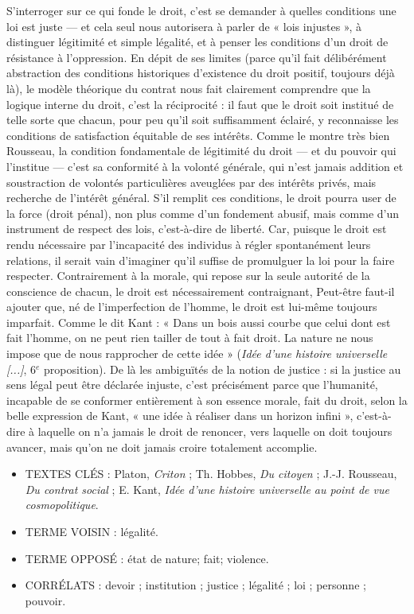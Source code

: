 S'interroger sur ce qui fonde le droit,
c'est se demander à quelles conditions
une loi est juste — et cela seul nous
autorisera à parler de « lois injustes », à
distinguer légitimité et simple légalité,
et à penser les conditions d’un droit de
résistance à l'oppression. En dépit de ses
limites (parce qu'il fait délibérément abstraction des conditions historiques
d'existence du droit positif, toujours déjà
là), le modèle théorique du contrat
nous fait clairement comprendre que la
logique interne du droit, c'est la réciprocité : il faut que le droit soit institué de
telle sorte que chacun, pour peu qu'il
soit suffisamment éclairé, y reconnaisse
les conditions de satisfaction équitable
de ses intérêts. Comme le montre très
bien Rousseau, la condition fondamentale de légitimité du droit — et du pouvoir qui l’institue — c'est sa conformité
à la volonté générale, qui n'est jamais
addition et soustraction de volontés particulières aveuglées par des intérêts
privés, mais recherche de l'intérêt général. S'il remplit ces conditions, le droit
pourra user de la force (droit pénal),
non plus comme d'un fondement abusif,
mais comme d’un instrument de respect
des lois, c'est-à-dire de liberté. Car,
puisque le droit est rendu nécessaire par
l'incapacité des individus à régler spontanément leurs relations, il serait vain
d'imaginer qu'il suffise de promulguer la
loi pour la faire respecter. Contrairement
à la morale, qui repose sur la seule
autorité de la conscience de chacun, le
droit est nécessairement contraignant,
Peut-être faut-il ajouter que, né de l’imperfection de l’homme,
 le droit est lui-même toujours imparfait. Comme le dit
Kant : « Dans un bois aussi courbe que
celui dont est fait l'homme, on ne peut
rien tailler de tout à fait droit. La nature
ne nous impose que de nous rapprocher
%
de cette idée » ({\it Idée d'une histoire universelle [...]}, 6$^e$ proposition). De là les
ambiguïtés de la notion de justice : si la
justice au sens légal peut être déclarée
injuste, c'est précisément parce que
l'humanité, incapable de se conformer
entièrement à son essence morale, fait
du droit, selon la belle expression de
Kant, « une idée à réaliser dans un horizon infini », c'est-à-dire à laquelle on n’a
jamais le droit de renoncer, vers laquelle
on doit toujours avancer, mais qu'on ne
doit jamais croire totalement accomplie.

\begin{itemize}[leftmargin=1cm, label=, itemsep=1pt]
\item {\footnotesize TEXTES CLÉS} : Platon, {\it Criton} ; Th. Hobbes, {\it Du citoyen} ;
 J.-J. Rousseau, {\it Du contrat social} ;
 E. Kant, {\it Idée d'une histoire universelle au point de vue cosmopolitique}.
\item {\footnotesize TERME VOISIN} : légalité.
\item {\footnotesize TERME OPPOSÉ} : état de nature; fait; violence.
\item {\footnotesize CORRÉLATS} : devoir ; institution ; justice ; légalité ; loi ; personne ; pouvoir.
\end{itemize}

